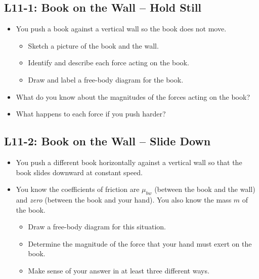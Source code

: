 \documentclass[]{article}
\newcommand{\Week}{11}
\begin{document}
\begin{PresentSpace}
\vspace{-10pt}
\section*{L\Week-1: Book on the Wall -- Hold Still}
\vspace{-10pt}
\begin{itemize}
	\item You push a book against a vertical wall so the book does not move.
	\begin{itemize}
		\item Sketch a picture of the book and the wall.
		\item Identify and describe each force acting on the book.
		\item Draw and label a free-body diagram for the book.
	\end{itemize}
	\item What do you know about the magnitudes of the forces acting on the book?
	\item What happens to each force if you push harder?
\end{itemize}
\end{PresentSpace}
\newpage
\begin{TeacherMargin}

\end{TeacherMargin}
\begin{PresentSpace}
\vspace{-10pt}
\section*{L\Week-2: Book on the Wall -- Slide Down}
\vspace{-10pt}
\begin{itemize}
	\item You push a different book horizontally against a vertical wall so that the book slides downward at constant speed.
	\item You know the coefficients of friction are $\mu_{bw}$ (between the book and the wall) and \textit{zero} (between the book and your hand). You also know the mass $m$ of the book.
	\begin{itemize}
		\item Draw a free-body diagram for this situation.
		\item Determine the magnitude of the force that your hand must exert on the book.
		\item Make sense of your answer in at least three different ways.
	\end{itemize}
\end{itemize}
\end{PresentSpace}
\end{document}
